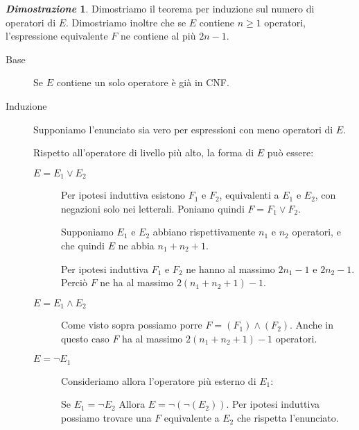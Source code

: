 \documentclass[12pt]{article}
\theoremstyle{definition}
\newtheorem*{myproof}{\em Dimostrazione}
\begin{document}
\begin{myproof}
  Dimostriamo il teorema per induzione sul numero di operatori di \(E\). Dimostriamo inoltre che
  se \(E\) contiene \(n \geq 1\) operatori, l'espressione equivalente \(F\) ne contiene
  al pi\`u \(2n-1\).

  \begin{description}

  \item[Base]
    Se \(E\) contiene un solo operatore \`e gi\`a in CNF.\newline
    
  \item[Induzione]
    Supponiamo l'enunciato sia vero per espressioni con meno operatori di \(E\). \newline

    Rispetto all'operatore di livello pi\`u alto, la forma di \(E\) pu\`o essere:\newline

    \begin{description}

      \item[\(E = E_1 \lor E_2\)] Per ipotesi induttiva esistono \(F_1\) e \(F_2\), equivalenti a \(E_1\) e \(E_2\),
        con negazioni solo nei letterali. Poniamo quindi \(F = F_1 \lor F_2\).\newline

        Supponiamo \(E_1\) e \(E_2\) abbiano rispettivamente \(n_1\) e \(n_2\) operatori, e che quindi
        \(E\) ne abbia \(n_1 + n_2 + 1\).\newline

        Per ipotesi induttiva \(F_1\) e \(F_2\) ne hanno al massimo \(2n_1-1\) e \(2n_2 -1\).
        Perci\`o \(F\) ne ha al massimo \(2(n_1 + n_2 + 1) - 1\).\newline

      \item[\(E = E_1 \land E_2\)] Come visto sopra possiamo porre \(F = (F_1) \land (F_2)\). Anche
        in questo caso \(F\) ha al massimo \(2(n_1 + n_2 + 1) - 1\) operatori.\newline

      \item[\(E = \lnot E_1\)] Consideriamo allora l'operatore pi\`u esterno di \(E_1\):\newline

        Se \(E_1 = \lnot E_2\) Allora \(E = \lnot(\lnot(E_2))\). Per ipotesi induttiva possiamo trovare una
        \(F\) equivalente a \(E_2\) che rispetta l'enunciato.\newline


\end{description}
\end{description}
\end{myproof}
\end{document}
